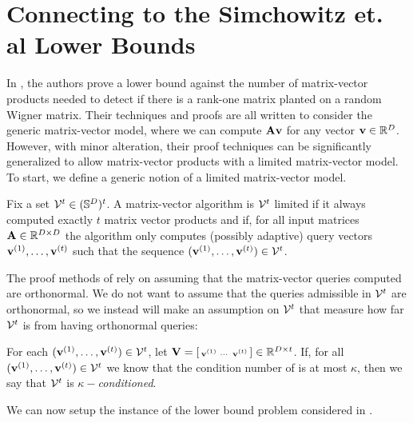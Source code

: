 

\section{Connecting to the Simchowitz et. al Lower Bounds}
\label{app:explain-simchowitz}

In \cite{simchowitz2017gap}, the authors prove a lower bound against the number of matrix-vector products needed to detect if there is a rank-one matrix planted on a random Wigner matrix.
Their techniques and proofs are all written to consider the generic matrix-vector model, where we can compute \(\mathbf{A}\boldsymbol{\mathrm{v}}\) for any vector \(\boldsymbol{\mathrm{v}}\in{\mathbb R}^D\).
However, with minor alteration, their proof techniques can be significantly generalized to allow matrix-vector products with a limited matrix-vector model.
To start, we define a generic notion of a limited matrix-vector model.

\begin{definition}
    Fix a set \({\mathcal V}^t \in ({\mathbb S}^{D})^{t}\).
    A matrix-vector algorithm \cA is \({\mathcal V}^t\) limited if it always computed exactly \(t\) matrix vector products and if, for all input matrices \(\mathbf{A}\in{\mathbb R}^{D \times D}\) the algorithm only computes (possibly adaptive) query vectors \(\boldsymbol{\mathrm{v}}^{(1)},\ldots,\boldsymbol{\mathrm{v}}^{(t)}\) such that the sequence \((\boldsymbol{\mathrm{v}}^{(1)},\ldots,\boldsymbol{\mathrm{v}}^{(t)}) \in {\mathcal V}^t\).
\end{definition}

The proof methods of \cite{simchowitz2017gap} rely on assuming that the matrix-vector queries computed are orthonormal.
We do not want to assume that the queries admissible in \({\mathcal V}^t\) are orthonormal, so we instead will make an assumption on \({\mathcal V}^t\) that measure how far \({\mathcal V}^t\) is from having orthonormal queries:
\begin{definition}
    For each \((\boldsymbol{\mathrm{v}}^{(1)},\ldots,\boldsymbol{\mathrm{v}}^{(t)}) \in {\mathcal V}^t\), let \(\mathbf{V} = \left[\begin{smallmatrix} \boldsymbol{\mathrm{v}}^{(1)} & \cdots & \boldsymbol{\mathrm{v}}^{(t)} \end{smallmatrix}\right] \in {\mathbb R}^{D \times t}\).
    If, for all \((\boldsymbol{\mathrm{v}}^{(1)},\ldots,\boldsymbol{\mathrm{v}}^{(t)}) \in {\mathcal V}^t\) we know that the condition number of \mV is at most \(\kappa\), then we say that \({\mathcal V}^t\) is \emph{\(\kappa-\)conditioned}.
\end{definition}

We can now setup the instance of the lower bound problem considered in \cite{simchowitz2017gap}.



